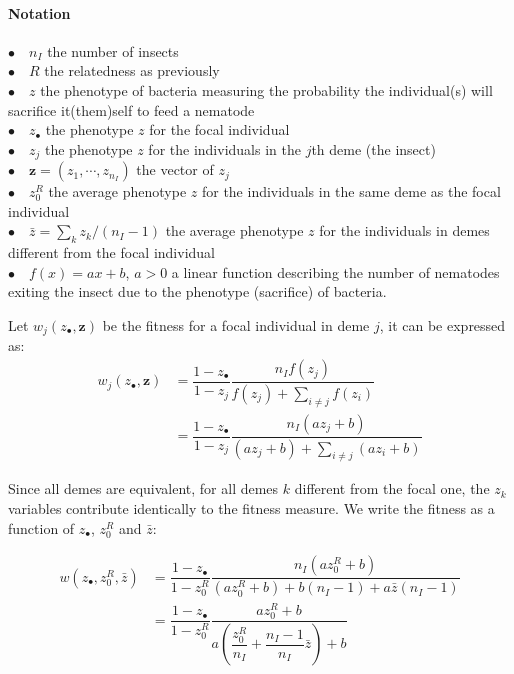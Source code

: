 \documentclass{article}
\begin{document}
  \paragraph{Notation} $ $\\
 $\bullet \quad n_I$ the number of insects \\
 $\bullet \quad R$ the relatedness as previously \\
 $\bullet \quad z$ the phenotype of bacteria measuring the probability the individual(s) will sacrifice it(them)self to feed a nematode\\
 $\bullet \quad z_\bullet $ the phenotype $z$ for the focal individual\\
 $\bullet \quad z_j$ the phenotype $z$ for the individuals in the $j$th deme (the insect)\\
 $\bullet \quad \mathbf{z}=(z_1,\cdots,z_{n_I})$ the vector of $z_j$\\
 $\bullet \quad z_0^R$ the average phenotype $z$ for the individuals in the same deme as the focal individual\\
 $\bullet \quad \bar{z}=\sum_k z_k / (n_I -1) $ the average phenotype $z$ for the individuals in demes different from the focal individual\\
 $\bullet \quad f (x)=ax+b$, $a>0$ a linear function describing the number of nematodes exiting the insect due to the phenotype (sacrifice) of bacteria.
 
 Let $ w_j(z_\bullet , \mathbf{z} )$ be the fitness for a focal individual in deme $j$, it can be expressed as:
 \begin{align}
 w_j(z_\bullet , \mathbf{z} ) &= \dfrac{1-z_\bullet}{1- z_j}\dfrac{n_I f(z_j)}{f(z_j)+\sum_{i \neq j} f(z_i)} \\
  &= \dfrac{1-z_\bullet}{1- z_j}\dfrac{n_I (a z_j +b) }{(a z_j +b)+\sum_{i \neq j} (a z_i +b)}
 \end{align}
 
 Since all demes are equivalent, for all demes $k$ different from the focal one, the $z_k$ variables contribute identically to the fitness measure. We write the fitness as a function of $z_\bullet$, $z_0^R$ and $\bar{z}$:
 
  \begin{align}
 w(z_\bullet ,z_0^R , \bar{z} ) &= \dfrac{1-z_\bullet}{1- z_0^R}\dfrac{n_I (a z_0^R +b) }{(a z_0^R +b)+ b(n_I -1) +a \bar{z} (n_I-1)} \\
 &= \dfrac{1-z_\bullet}{1- z_0^R}\dfrac{ a z_0^R +b }{a \left( \dfrac{z_0^R}{n_I} +\dfrac{n_I-1}{n_I} \bar{z} \right) +b} \\
  \end{align}
  
\end{document}
